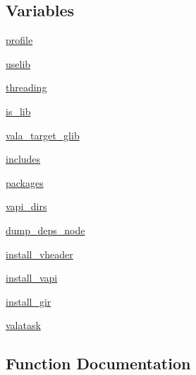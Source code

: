 \subsection*{Variables}
\begin{DoxyCompactItemize}
\item 
\hyperlink{namespacewaflib_1_1_tools_1_1vala_ac0c3b4f3bf828ae6dda80b90a16994e1}{profile}
\item 
\hyperlink{namespacewaflib_1_1_tools_1_1vala_ae1307477fe2c49e6c3c5b324108e7e9f}{uselib}
\item 
\hyperlink{namespacewaflib_1_1_tools_1_1vala_a5324237aeb8614255136caaa81f95154}{threading}
\item 
\hyperlink{namespacewaflib_1_1_tools_1_1vala_a87b3d15fccce2261a30b1fd250af9d2a}{is\+\_\+lib}
\item 
\hyperlink{namespacewaflib_1_1_tools_1_1vala_aeb3f063bb00b999bcee84bfb8b9f6d29}{vala\+\_\+target\+\_\+glib}
\item 
\hyperlink{namespacewaflib_1_1_tools_1_1vala_adc79ca8e84ec2047379c7a5acdd6b148}{includes}
\item 
\hyperlink{namespacewaflib_1_1_tools_1_1vala_a8238eaae6fab21857172c5d14cd274a5}{packages}
\item 
\hyperlink{namespacewaflib_1_1_tools_1_1vala_aa257ce1418040461bced7d2d05bdaf75}{vapi\+\_\+dirs}
\item 
\hyperlink{namespacewaflib_1_1_tools_1_1vala_ac017e8cf8d9237c8906ee97a3bcec0e3}{dump\+\_\+deps\+\_\+node}
\item 
\hyperlink{namespacewaflib_1_1_tools_1_1vala_af800b938b7287032b592a0db86b3345b}{install\+\_\+vheader}
\item 
\hyperlink{namespacewaflib_1_1_tools_1_1vala_a16c49317454c9080e0dee44e07f00d09}{install\+\_\+vapi}
\item 
\hyperlink{namespacewaflib_1_1_tools_1_1vala_a6d5b038dc439abe3c8b941a02977614d}{install\+\_\+gir}
\item 
\hyperlink{namespacewaflib_1_1_tools_1_1vala_ad126b4a64437383ddaf43ac3b47df2c8}{valatask}
\end{DoxyCompactItemize}


\subsection{Function Documentation}
